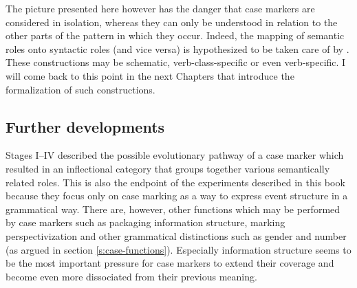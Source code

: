 The picture presented here however has the danger that case markers are considered in isolation, whereas they can only be understood in relation to the other parts of the pattern in which they occur. Indeed, the mapping of semantic roles onto syntactic roles (and vice versa) is hypothesized to be taken care of by  \citep{goldberg95construction}. These constructions may be schematic, verb-class-specific or even verb-specific. I will come back to this point in the next Chapters that introduce the formalization of such constructions.

\subsection{Further developments}
\label{s:case-markers}

Stages I--IV described the possible evolutionary pathway of a case marker which resulted in an inflectional category that groups together various semantically related roles. This is also the endpoint of the experiments described in this book because they focus only on case marking as a way to express event structure in a grammatical way. There are, however, other functions which may be performed by case markers such as packaging information structure, marking perspectivization and other grammatical distinctions such as gender and number (as argued in section \ref{s:case-functions}). Especially information structure seems to be the most important pressure for case markers to extend their coverage and become even more dissociated from their previous meaning.

